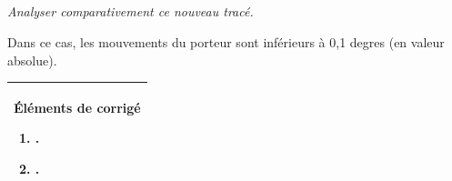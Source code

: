 \documentclass[10pt,fleqn]{article} %
\newif\ifcolle
\begin{document}
\begin{multicols}{2}
\subparagraph{}
\textit{Analyser comparativement ce nouveau tracé.}%
\ifprof
\begin{corrige}
Dans ce cas, les mouvements du porteur sont inférieurs à 0,1 degres (en valeur absolue).
\end{corrige}
\else
\fi



\ifcolle
\else
\vspace{.5cm}
\begin{tabular}{|p{.95\linewidth}|}
\hline
Éléments de corrigé
\begin{enumerate}
\item .
\item .
\end{enumerate}\\
\hline
\end{tabular}
\fi

\ifprof
\else
\end{multicols}
\fi
\end{document}
